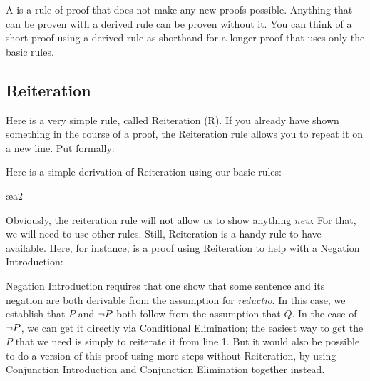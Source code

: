A  is a rule of proof that does not make any new proofs possible. Anything that can be proven with a derived rule can be proven without it. You can think of a short proof using a derived rule as shorthand for a longer proof that uses only the basic rules. 


\subsection{Reiteration}
\label{sec:reiteration}

Here is a very simple rule, called Reiteration (R). If you already have shown something in the course of a proof, the Reiteration rule allows you to repeat it on a new line. Put formally:

\begin{ndproof}
	\metaA{}
	\metaA{} 
\end{ndproof}

Here is a simple derivation of Reiteration using our basic rules:

\begin{ndproof}
	\metaA{}
	 
	\metaA{}  \ae{a2}
\end{ndproof}

Obviously, the reiteration rule will not allow us to show anything \emph{new}. For that, we will need to use other rules. Still, Reiteration is a handy rule to have available. Here, for instance, is a proof using Reiteration to help with a Negation Introduction:

\begin{ndproof}
	 
	\open
		 
	\close
\end{ndproof}

Negation Introduction requires that one show that some sentence and its negation are both derivable from the assumption for \emph{reductio}. In this case, we establish that $P$ and $\neg P$ both follow from the assumption that $Q$. In the case of $\neg P$, we can get it directly via Conditional Elimination; the easiest way to get the $P$ that we need is simply to reiterate it from line 1. But it would also be possible to do a version of this proof using more steps without Reiteration, by using Conjunction Introduction and Conjunction Elimination together instead.

